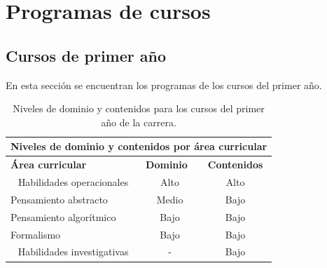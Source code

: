 ﻿\chapter{Programas de cursos}


\section{Cursos de primer año}


En esta sección se encuentran los programas de los cursos del primer año. 


\begin{table}[H]
\begin{center}
\begin{tabular}{|ccc|}
\hline
\multicolumn{3}{|c|}{\cellcolor[HTML]{00C0F3} \textbf{Niveles de dominio y contenidos por área curricular}} \\ \hline
\multicolumn{1}{|l|}{\cellcolor[HTML]{8ED8F8}\textbf{Área curricular}} & \multicolumn{1}{l|}{\cellcolor[HTML]{8ED8F8}\textbf{Dominio}} & \cellcolor[HTML]{8ED8F8}\textbf{Contenidos} \\ \hline
\multicolumn{1}{|c|}{Habilidades operacionales} & \multicolumn{1}{c|}{Alto} & Alto \\ \hline
\multicolumn{1}{|l|}{Pensamiento abstracto} & \multicolumn{1}{c|}{Medio} & Bajo \\ \hline
\multicolumn{1}{|l|}{Pensamiento algorítmico} & \multicolumn{1}{c|}{Bajo} & Bajo \\ \hline
\multicolumn{1}{|l|}{Formalismo} & \multicolumn{1}{c|}{Bajo} & Bajo \\ \hline
\multicolumn{1}{|c|}{Habilidades investigativas} & \multicolumn{1}{c|}{-} & Bajo \\ \hline
\end{tabular}
\end{center}
\caption{Niveles de dominio y contenidos para los cursos del primer año de la carrera.}
\end{table}


